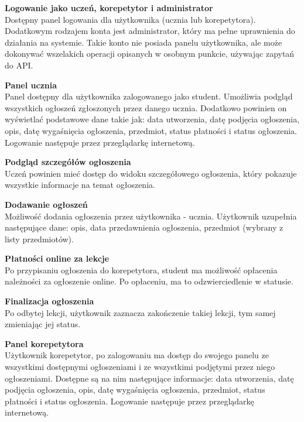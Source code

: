 \documentclass[12pt]{article}
\numberwithin{figure}{section}
\begin{document}
    \noindent
    \textbf{Logowanie jako uczeń, korepetytor i administrator}\\
    \indent  
    Dostępny panel logowania dla użytkownika (ucznia lub korepetytora). Dodatkowym rodzajem konta jest administrator, który ma pełne uprawnienia do działania na systemie. Takie konto nie posiada panelu użytkownika, ale może dokonywać wszelakich operacji opisanych w osobnym punkcie, używając zapytań do API.
            
    \noindent
    \textbf{Panel ucznia}\\
    \indent
    Panel dostępny dla użytkownika zalogowanego jako student. Umożliwia podgląd wszystkich ogłoszeń zgłoszonych przez danego ucznia. Dodatkowo powinien on wyświetlać podstawowe dane takie jak: data utworzenia, datę podjęcia ogłoszenia, opis, datę wygaśnięcia ogłoszenia, przedmiot, status płatności i status ogłoszenia. Logowanie następuje przez przeglądarkę internetową. 
        
    \noindent
    \textbf{Podgląd szczegółów ogłoszenia}\\
    \indent
    Uczeń powinien mieć dostęp do widoku szczegółowego ogłoszenia, który pokazuje wszystkie informacje na temat ogłoszenia.
        
    \noindent
    \textbf{Dodawanie ogłoszeń}\\
    \indent
    Możliwość dodania ogłoszenia przez użytkownika - ucznia. Użytkownik uzupełnia następujące dane: opis, data przedawnienia ogłoszenia, przedmiot (wybrany z listy przedmiotów). 
        
    \noindent
    \textbf{Płatności online za lekcje}\\
    \indent
    Po przypisaniu ogłoszenia do korepetytora, student ma możliwość opłacenia należności za ogłoszenie online. Po opłaceniu, ma to odzwierciedlenie w statusie. 
        
    \noindent
    \textbf{Finalizacja ogłoszenia}\\
    \indent
    Po odbytej lekcji, użytkownik zaznacza zakończenie takiej lekcji, tym samej zmieniając jej status.
        
    \noindent
    \textbf{Panel korepetytora}\\
    \indent
    Użytkownik korepetytor, po zalogowaniu ma dostęp do swojego panelu ze wszystkimi dostępnymi ogłoszeniami i ze wszystkimi podjętymi przez niego ogłoszeniami. Dostępne są na nim następujące informacje: data utworzenia, datę podjęcia ogłoszenia, opis, datę wygaśnięcia ogłoszenia, przedmiot, status płatności i status ogłoszenia. Logowanie następuje przez przeglądarkę internetową. 
        
\end{document}

